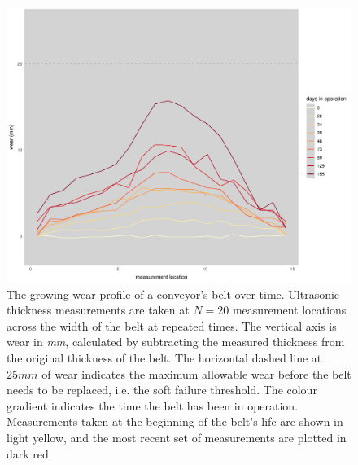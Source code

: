 \begin{figure}
  \centering
  \includegraphics[width=\textwidth]{figures/ch-6/main_belt.pdf}
  \caption{The growing wear profile of a conveyor's belt over time. Ultrasonic thickness measurements are taken at $N = 20$ measurement locations across the width of the belt at repeated times. The vertical axis is wear in \textit{mm}, calculated by subtracting the measured thickness from the original thickness of the belt. The horizontal dashed line at $25mm$ of wear indicates the maximum allowable wear before the belt needs to be replaced, i.e. the soft failure threshold. The colour gradient indicates the time the belt has been in operation. Measurements taken at the beginning of the belt's life are shown in light yellow, and the most recent set of measurements are plotted in dark red}
  \label{fig:ut-example}
\end{figure}

